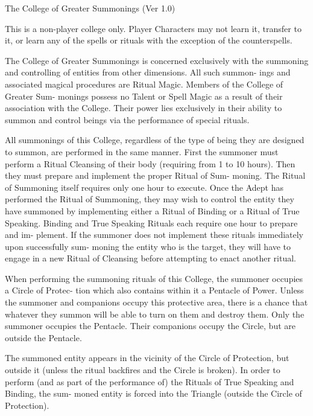 \begin{Chapter}{The College of Greater Summonings (Ver 1.0)}

This is a non-player college only.  Player Characters may not learn
it, transfer to it, or learn any of the spells or rituals with the
exception of the counterspells.

The  College  of  Greater  Summonings  is  concerned 
exclusively with the summoning and controlling of 
entities  from other  dimensions.  All  such  summon-
ings  and  associated  magical  procedures  are  Ritual 
Magic.  Members  of  the  College  of  Greater  Sum-
monings  possess  no  Talent  or  Spell  Magic  as  a 
result  of  their  association  with  the  College.  Their 
power  lies  exclusively  in  their  ability  to  summon 
and  control  beings  via  the  performance  of  special 
rituals. 

All  summonings  of  this  College,  regardless  of  the 
type  of  being  they  are  designed  to  summon,  are 
performed in the same manner. First the summoner 
must  perform  a  Ritual  Cleansing  of  their  body 
(requiring  from  1  to  10  hours).  Then  they  must 
prepare  and  implement  the  proper  Ritual  of  Sum-
moning.  The  Ritual  of  Summoning  itself  requires 
only  one  hour  to  execute.  Once  the  Adept  has 
performed  the  Ritual  of  Summoning,  they  may 
wish to control the entity they have  summoned by 
implementing either a Ritual of Binding or a Ritual 
of  True  Speaking.  Binding  and  True  Speaking 
Rituals  each  require  one  hour  to  prepare  and  im-
plement.  If  the  summoner  does  not  implement 
these  rituals  immediately  upon  successfully  sum-
moning the entity who is the target, they will have 
to  engage  in  a  new  Ritual  of  Cleansing  before 
attempting to enact another ritual. 

When  performing  the  summoning  rituals  of  this 
College, the summoner occupies a Circle of Protec-
tion  which  also  contains  within  it  a  Pentacle  of 
Power.  Unless  the  summoner  and  companions 
occupy  this  protective  area,  there  is  a  chance  that 
whatever they summon will be able to turn on them 
and destroy them. Only the summoner occupies the 
Pentacle. Their companions occupy the Circle, but 
are outside the Pentacle. 

The summoned entity appears in the vicinity of the 
Circle of Protection, but outside it (unless the ritual 
backfires  and  the  Circle  is  broken).  In  order  to 
perform  (and  as  part  of  the  performance  of)  the 
Rituals  of  True  Speaking  and  Binding,  the  sum-
moned  entity  is  forced  into  the  Triangle  (outside 
the Circle of Protection). 


\end{Chapter}
